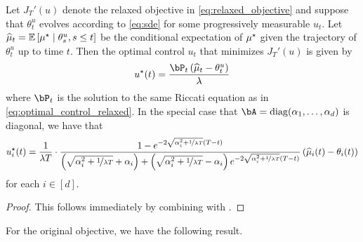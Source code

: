\begin{corollary}
    Let $J_T'(u)$ denote the relaxed objective in \eqref{eq:relaxed_objective} and suppose that $\theta_t^u$ evolves according to \eqref{eq:sde} for some progressively measurable $u_t$.  Let $\widehat{\mu}_t = \mathbb{E}\left[ \mu^{\star} \mid \theta_s^u, s \leq t \right]$ be the conditional expectation of $\mu^{\star}$ given the trajectory of $\theta_t^u$ up to time $t$.  Then the optimal control $u_t$ that minimizes $J_T'(u)$ is given by
    \begin{align}
        \ustar(t) = \frac{\bP_t \left( \muhat_t - \theta_t^u \right)}{\lambda}
    \end{align}
    where $\bP_t$ is the solution to the same Riccati equation as in \eqref{eq:optimal_control_relaxed}.  In the special case that $\bA = \diag(\alpha_1, \dots, \alpha_d)$ is diagonal, we have that
    \begin{align}
        u^{\star}_i(t) = \frac{1}{\lambda T} \cdot \frac{1 - e^{- 2 \sqrt{\alpha_i^2 + \nicefrac{1}{\lambda T}} (T -t)}}{\left( \sqrt{\alpha_i^2 + \nicefrac{1}{\lambda T}} + \alpha_i \right) + \left( \sqrt{\alpha_i^2 + \nicefrac{1}{\lambda T}} - \alpha_i \right) e^{- 2 \sqrt{\alpha_i^2 + \nicefrac{1}{\lambda T}} (T - t)}} \left( \widehat{\mu}_i(t) - \theta_i(t) \right)
    \end{align}
    for each $i \in [d]$.
\end{corollary}
\begin{proof}
    This follows immediately by combining  with .
\end{proof}
For the original objective, we have the following result.
